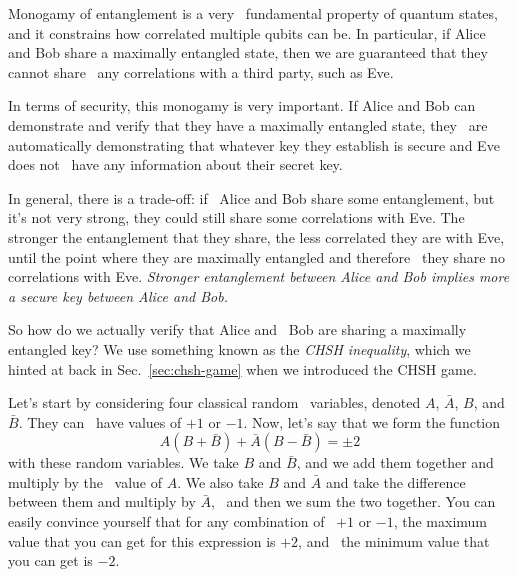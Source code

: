 Monogamy of entanglement is a very 
fundamental property of quantum states,
and it constrains how correlated
multiple qubits can be. In particular, if Alice 
and Bob share a maximally entangled state,
then we are guaranteed that they cannot share 
any correlations with a third party, such as Eve.

In terms of security, this monogamy is very important.
If Alice and Bob can demonstrate and verify that
they have a maximally entangled state, they 
are automatically demonstrating that whatever
key they establish is secure and Eve does not 
have any information about their secret key.

In general, there is a trade-off: if 
Alice and Bob share some entanglement, but it's not very strong,
they could still share some correlations with Eve.
The stronger the entanglement that they share,
the less correlated they are with Eve, 
until the point where they
are maximally entangled and therefore 
they share no correlations with Eve.
\emph{Stronger entanglement between Alice and Bob implies more a secure key between Alice and Bob.}

So how do we actually verify that Alice and 
Bob are sharing a maximally entangled key?
We use something known as the \emph{CHSH inequality}, which we hinted at back in Sec.~\ref{sec:chsh-game} when we introduced the CHSH game.

Let's start by considering four classical random 
variables, denoted $A$,
$\bar{A}$, $B$, and $\bar{B}$. They can 
have values of $+1$ or $-1$.
Now, let's say that we form the function 
\begin{equation}
A(B+\bar{B})+\bar{A}(B-\bar{B})=\pm 2
\end{equation}
with these random variables.
We take $B$ and $\bar{B}$,
and we add them together and multiply by the 
value of $A$. We also take $B$ and $\bar{A}$ and take
the difference between them and multiply by $\bar{A}$, 
and then we sum the two together. You can easily
convince yourself that for any combination of 
$+1$ or $-1$, the maximum value that
you can get for this expression is $+2$, and 
the minimum value that you can get is $-2$.

